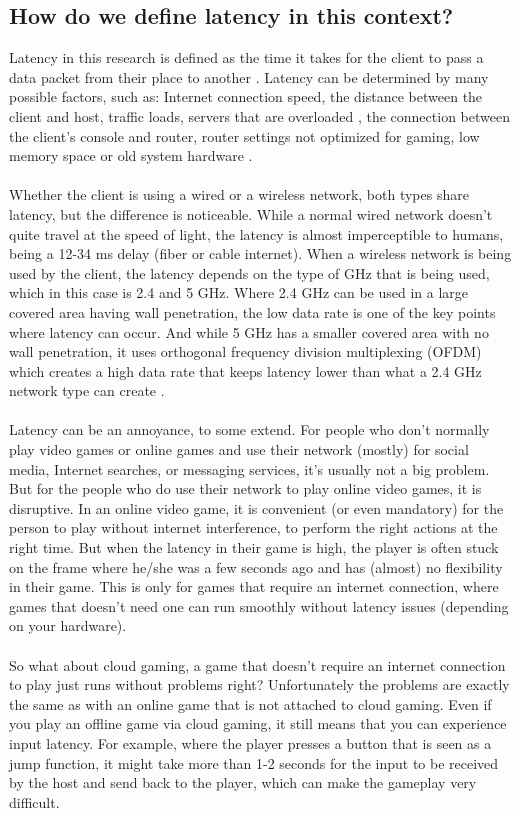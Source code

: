 \subsection{How do we define latency in this context?}
Latency in this research is defined as the time it takes for the client to pass a data packet from their place to another \parencite{cloudfare}. Latency can be determined by many possible factors, such as: Internet connection speed, the distance between the client and host, traffic loads, servers that are overloaded \parencite{thg}, the connection between the client's console and router, router settings not optimized for gaming, low memory space or old system hardware \parencite{ulmer} \parencite{weak}.\\\\
Whether the client is using a wired or a wireless network, both types share latency, but the difference is noticeable. While a normal wired network doesn't quite travel at the speed of light, the latency is almost imperceptible to humans, being a 12-34 ms delay (fiber or cable internet). When a wireless network is being used by the client, the latency depends on the type of GHz that is being used, which in this case is 2.4 and 5 GHz. Where 2.4 GHz can be used in a large covered area having wall penetration, the low data rate is one of the key points where latency can occur. And while 5 GHz has a smaller covered area with no wall penetration, it uses orthogonal frequency division multiplexing (OFDM) which creates a high data rate that keeps latency lower than what a 2.4 GHz network type can create \parencite{century} \parencite{netgear}.\\\\
Latency can be an annoyance, to some extend. For people who don't normally play video games or online games and use their network (mostly) for social media, Internet searches, or messaging services, it's usually not a big problem. But for the people who do use their network to play online video games, it is disruptive. In an online video game, it is convenient (or even mandatory) for the person to play without internet interference, to perform the right actions at the right time. But when the latency in their game is high, the player is often stuck on the frame where he/she was a few seconds ago and has (almost) no flexibility in their game. This is only for games that require an internet connection, where games that doesn't need one can run smoothly without latency issues (depending on your hardware).\\\\
So what about cloud gaming, a game that doesn't require an internet connection to play just runs without problems right? Unfortunately the problems are exactly the same as with an online game that is not attached to cloud gaming. Even if you play an offline game via cloud gaming, it still means that you can experience input latency. For example, where the player presses a button that is seen as a jump function, it might take more than 1-2 seconds for the input to be received by the host and send back to the player, which can make the gameplay very difficult.
